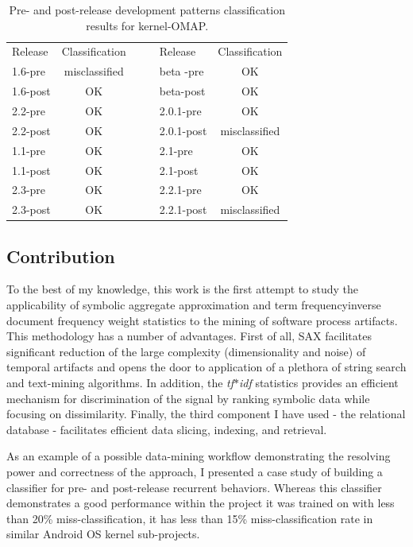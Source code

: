 \documentclass[conference]{worldcomp}
\begin{document}
\begin{table}
  \caption{Pre- and post-release development patterns classification results for kernel-OMAP.}
  \label{tab:success}
  \begin{tabular}{ | l | c | c c | l | c |}
  \cline{1-2} \cline{5-6}
  Release & Classification& & & Release & Classification\\
  \cline{1-2} \cline{5-6}
1.6-pre & misclassified & & & beta -pre & OK \\
1.6-post & OK & & & beta-post & OK \\
2.2-pre & OK & & & 2.0.1-pre & OK \\
2.2-post & OK & & & 2.0.1-post & misclassified \\
1.1-pre & OK & & & 2.1-pre & OK \\
1.1-post & OK & & & 2.1-post & OK \\
2.3-pre & OK & & & 2.2.1-pre & OK \\
2.3-post & OK & & & 2.2.1-post & misclassified \\ 
  \cline{1-2} \cline{5-6}
  \end{tabular}
\end{table}

\subsection{Contribution}
To the best of my knowledge, this work is the first attempt to study the applicability
of symbolic aggregate approximation and term frequency\textendash inverse document frequency
weight statistics to the mining of software process artifacts. 
This methodology has a number of advantages. First of all, SAX facilitates significant 
reduction of the large complexity (dimensionality and noise) of temporal artifacts 
and opens the door to application of a plethora of string search and text-mining algorithms.
In addition, the \textit{tf$\ast$idf} statistics provides an efficient mechanism for 
discrimination of the signal by ranking symbolic data while focusing on dissimilarity.
Finally, the third component I have used - the relational database - facilitates 
efficient data slicing, indexing, and retrieval.

As an example of a possible data-mining workflow demonstrating the resolving power 
and correctness of the approach, I presented a case study of building a classifier
for pre- and post-release recurrent behaviors. 
Whereas this classifier demonstrates a good performance within the project it was 
trained on with less than 20\% miss-classification, it has less than 15\% 
miss-classification rate in similar Android OS kernel sub-projects.
\end{document}
